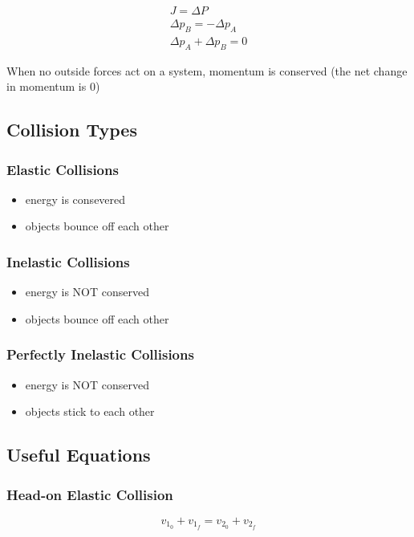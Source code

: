 \documentclass[titlepage]{article}
\begin{document}
\begin{align*}
    J = \Delta P \\ 
    \Delta p_B = -\Delta p_A \\
    \Delta p_A + \Delta p_B = 0
\end{align*}

When no outside forces act on a system, momentum is conserved (the net change in momentum is 0)

\subsection{Collision Types}
\subsubsection{Elastic Collisions}
\begin{itemize}
    \item energy is consevered
    \item objects bounce off each other
\end{itemize}

\subsubsection{Inelastic Collisions}
\begin{itemize}
    \item energy is NOT conserved
    \item objects bounce off each other
\end{itemize}

\subsubsection{Perfectly Inelastic Collisions}
\begin{itemize}
    \item energy is NOT conserved
    \item objects stick to each other
\end{itemize}

\subsection{Useful Equations}
\subsubsection{Head-on Elastic Collision}
\begin{equation*}
    v_{1_0} + v_{1_f} = v_{2_0} + v_{2_f}
\end{equation*}
\end{document}
